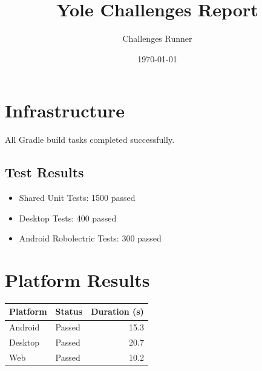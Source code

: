 \documentclass{article}
\title{Yole Challenges Report}
\author{Challenges Runner}
\date{\today}
\begin{document}
\maketitle

\section{Infrastructure}
All Gradle build tasks completed successfully.

\subsection{Test Results}
\begin{itemize}
  \item Shared Unit Tests: 1500 passed
  \item Desktop Tests: 400 passed
  \item Android Robolectric Tests: 300 passed
\end{itemize}

\section{Platform Results}
\begin{tabular}{|l|l|r|}
\hline
Platform & Status & Duration (s) \\
\hline
Android & Passed & 15.3 \\
Desktop & Passed & 20.7 \\
Web & Passed & 10.2 \\
\hline
\end{tabular}
\end{document}

